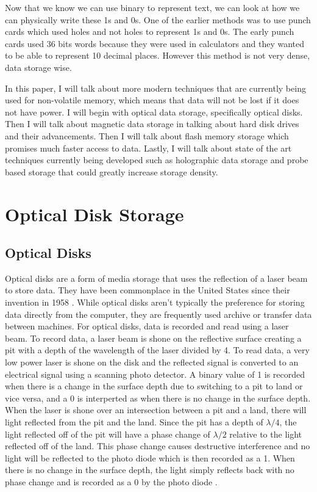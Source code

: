 \documentclass[ notitlepage, numerical, 11pt]{revtex4-1} %
\begin{document}
Now that we know we can use binary to represent text, we can look at how we can physically write these 1s and 0s. One of the earlier methods was to use punch cards which used holes and not holes to represent 1s and 0s. The early punch cards used 36 bits words because they were used in calculators and they wanted to be able to represent 10 decimal places. However this method is not very dense, data storage wise.


In this paper, I will talk about more modern techniques that are currently being used for non-volatile memory, which means that data will not be lost if it does not have power. I will begin with optical data storage, specifically optical disks. Then I will talk about magnetic data storage in talking about hard disk drives and their advancements. Then I will talk about flash memory storage which promises much faster access to data. Lastly, I will talk about state of the art techniques currently being developed such as holographic data storage and probe based storage that could greatly increase storage density.





\section{Optical Disk Storage}
\subsection{Optical Disks}
Optical disks are a form of media storage that uses the reflection of a laser beam to store data. They have been commonplace in the United States since their invention in 1958 \cite{memory}. While optical disks aren't typically the preference for storing data directly from the computer, they are frequently used archive or transfer data between machines. For optical disks, data is recorded and read using a laser beam. To record data, a laser beam is shone on the reflective surface creating a pit with a depth of the wavelength of the laser divided by 4. To read data, a very low power laser is shone on the disk and the reflected signal is converted to an electrical signal using a scanning photo detector. A binary value of 1 is recorded when there is a change in the surface depth due to switching to a pit to land or vice versa, and a 0 is interperted as when there is no change in the surface depth. When the laser is shone over an intersection between a pit and a land, there will light reflected from the pit and the land. Since the pit has a depth of $\lambda/4$, the light reflected off of the pit will have a phase change of $\lambda/2$ relative to the light reflected off of the land. This phase change causes destructive interference and no light will be reflected to the photo diode which is then recorded as a 1. When there is no change in the surface depth, the light simply reflects back with no phase change and is recorded as a 0 by the photo diode \cite{memory}.
\end{document}
